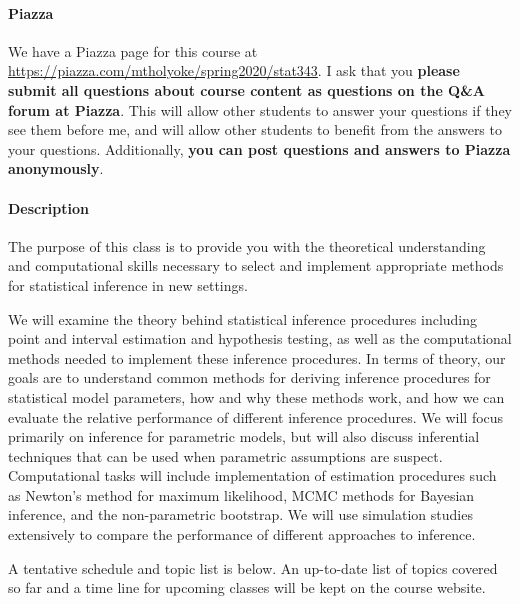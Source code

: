 \documentclass[11pt]{article}
\begin{document}
\paragraph{Piazza}

We have a Piazza page for this course at \url{https://piazza.com/mtholyoke/spring2020/stat343}.  I ask that you \textbf{please submit all questions about course content as questions on the Q{\&}A forum at Piazza}.  This will allow other students to answer your questions if they see them before me, and will allow other students to benefit from the answers to your questions.  Additionally, \textbf{you can post questions and answers to Piazza anonymously}.

\paragraph{Description}

The purpose of this class is to provide you with the theoretical understanding and computational skills necessary to select and implement appropriate methods for statistical inference in new settings.

We will examine the theory behind statistical inference procedures including point and interval estimation and hypothesis testing, as well as the computational methods needed to implement these inference procedures.  In terms of theory, our goals are to understand common methods for deriving inference procedures for statistical model parameters, how and why these methods work, and how we can evaluate the relative performance of different inference procedures.  We will focus primarily on inference for parametric models, but will also discuss inferential techniques that can be used when parametric assumptions are suspect.  Computational tasks will include implementation of estimation procedures such as Newton's method for maximum likelihood, MCMC methods for Bayesian inference, and the non-parametric bootstrap.  We will use simulation studies extensively to compare the performance of different approaches to inference.

A tentative schedule and topic list is below.  An up-to-date list of topics covered so far and a time line for upcoming classes will be kept on the course website.
\end{document}
